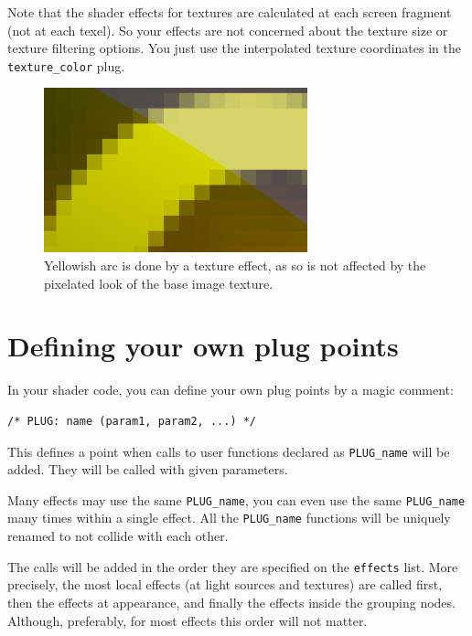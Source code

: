 \documentclass{acmsiggraph}                     %
\newenvironment{mycode}
{\begin{mycodecore}}
{\end{mycodecore}
\vspace{-0.1in}}
\begin{document}
Note that the shader effects for textures are calculated at each screen fragment
(not at each texel). So your effects are not concerned about the texture size
or texture filtering options. You just use the interpolated texture
coordinates in the \texttt{texture\_color} plug.

\begin{figure}[H]
  \centering
  \includegraphics[width=3in]{shader_texture_no_filtering_problems}
  \caption{Yellowish arc is done by a texture effect, as so is not
    affected by the pixelated look of the base image texture.}
\end{figure}

\section{Defining your own plug points}

In your shader code, you can define your own plug points by a
magic comment:

\begin{mycode}
\begin{Verbatim}[commandchars=\\\{\}]
/* PLUG: name (param1, param2, ...) */
\end{Verbatim}
\end{mycode}

This defines a point when calls to user functions declared as
\texttt{PLUG\_name} will be added. They will be called with given
parameters.

Many effects may use the same \texttt{PLUG\_name},
you can even use the same \texttt{PLUG\_name} many times within a single
effect. All the \texttt{PLUG\_name} functions
will be uniquely renamed to not collide with each other.

The calls will be added in the order they are specified on the
\texttt{effects} list. More precisely, the most local effects
(at light sources and textures) are called first, then the effects
at appearance, and finally the effects inside the grouping nodes.
Although, preferably, for most effects this order will not matter.
\end{document}
